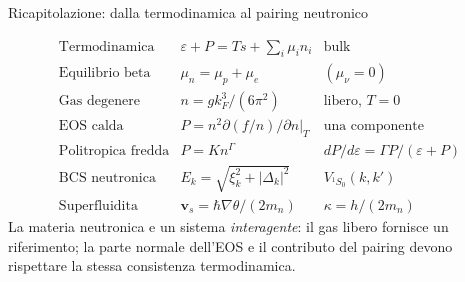 \begin{frame}[t]{Ricapitolazione: dalla termodinamica al pairing neutronico}
\vspace*{3mm}
\small

\[
\begin{array}{lll}
\text{Termodinamica}&\varepsilon+P=Ts+\sum_i\mu_in_i&\text{bulk}\\[3pt]
\text{Equilibrio beta}&\mu_n=\mu_p+\mu_e& (\mu_\nu=0)\\[3pt]
\text{Gas degenere}&n=gk_F^3/(6\pi^2)&\text{libero, }T=0\\[3pt]
\text{EOS calda}&P=n^2\partial(f/n)/\partial n|_T&\text{una componente}\\[3pt]
\text{Politropica fredda}&P=Kn^\Gamma&dP/d\varepsilon=\Gamma P/(\varepsilon+P)\\[3pt]
\text{BCS neutronica}&E_k=\sqrt{\xi_k^2+|\Delta_k|^2}&V_{{}^1S_0}(k,k')\\[3pt]
\text{Superfluidita}&\mathbf v_s=\hbar\nabla\theta/(2m_n)&\kappa=h/(2m_n)
\end{array}
\]
La materia neutronica e un sistema \emph{interagente}: il gas libero
fornisce un riferimento; la parte normale dell'EOS e il contributo
del pairing devono rispettare la stessa consistenza termodinamica.
\end{frame}

